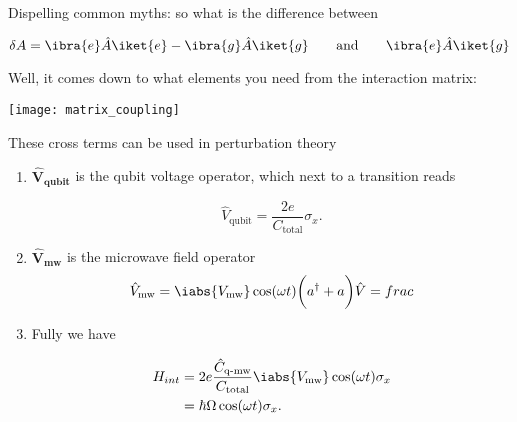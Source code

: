 \begin{framed}
  \noindent Dispelling common myths: so what is the difference between

  \begin{equation}
    \label{eq:myth1}
    \delta A = \ibra{e}\hat{A}\iket{e} - \ibra{g}\hat{A}\iket{g} \qquad \text{and} \qquad \ibra{e}\hat{A}\iket{g}
  \end{equation}

  \noindent Well, it comes down to what elements you need from the interaction matrix:

  \begin{center}
    \texttt{[image: matrix\_coupling]}

    {\small These cross terms can be used in perturbation theory\label{fig:matrix_coupling}}
  \end{center}
 
\end{framed}
\begin{enumerate}

\item  $ \mathbf{\hat{V}_\text{qubit}}  $  is the  qubit  voltage operator,  which  next to  a
  transition reads
	
	\begin{equation}\label{eq:couple5}
          \hat{V}_\text{qubit} = \frac{2e}{C_\text{total}}\sigma_x.
	\end{equation}
	
      \item $ \mathbf{\hat{V}_\text{mw}} $ is the microwave field operator
	\begin{equation}\label{eq:couple6}
          {\hat{V}_\text{mw} = \iabs{V_{\text{mw}}}\cos(\omega t)\bigg(a^\dagger +a\bigg) }
          \hat{V}=frac
	\end{equation}
      \item Fully we have
	
	\begin{equation}
          \begin{aligned}
            H_{int}&=2e\frac{\hat{C}_\text{q-mw}}{C_\text{total}}\iabs{V_{\text{mw}}}\cos(\omega t)\sigma_x\\
            &= \hbar\Omega\cos(\omega t)\sigma_x.
          \end{aligned}
	\end{equation}
      \end{enumerate}

    
